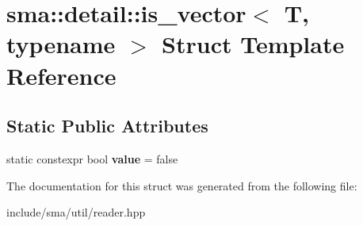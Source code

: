\hypertarget{structsma_1_1detail_1_1is__vector}{\section{sma\-:\-:detail\-:\-:is\-\_\-vector$<$ T, typename $>$ Struct Template Reference}
\label{structsma_1_1detail_1_1is__vector}
}
\subsection*{Static Public Attributes}
\begin{DoxyCompactItemize}
\item 
\hypertarget{structsma_1_1detail_1_1is__vector_a0d0a056b5791ed01b2740666eec70f68}{static constexpr bool {\bfseries value} = false}\label{structsma_1_1detail_1_1is__vector_a0d0a056b5791ed01b2740666eec70f68}

\end{DoxyCompactItemize}


The documentation for this struct was generated from the following file\-:\begin{DoxyCompactItemize}
\item 
include/sma/util/reader.\-hpp\end{DoxyCompactItemize}
